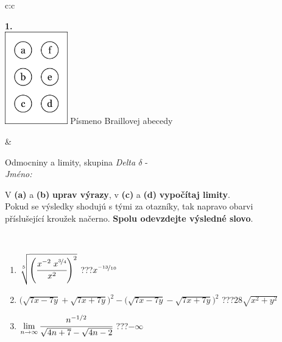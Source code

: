 \documentclass[10pt]{report}
\begin{document}
\begin{tabular}{c:c}
\begin{minipage}[c][104.5mm][t]{0.5\linewidth}
\begin{center}
\begin{minipage}{0.20\linewidth}
\begin{center}
{\Huge\bfseries 1.} \\[2mm]
\includegraphics[height=40mm]{../images/braille.png}
{\small Písmeno Braillovej abecedy}
\end{center}
\end{minipage}
\end{center}
\end{minipage}
&
\begin{minipage}[c][104.5mm][t]{0.5\linewidth}
\begin{center}
\vspace{7mm}
{\huge Odmocniny a limity, skupina \textit{Delta $\delta$} -}\\[5mm]
\textit{Jméno:}\phantom{xxxxxxxxxxxxxxxxxxxxxxxxxxxxxxxxxxxxxxxxxxxxxxxxxxxxxxxxxxxxxxxxx}\\[5mm]
\begin{minipage}{0.95\linewidth}
\begin{center}
V \textbf{(a)} a \textbf{(b)} \textbf{uprav výrazy}, v \textbf{(c)} a \textbf{(d)} \textbf{vypočítaj limity}.\\Pokud se výsledky shodujú s tými za otazníky, tak napravo obarvi\\příslušející kroužek načerno. \textbf{Spolu odevzdejte výsledné slovo}.
\end{center}
\end{minipage}
\\[1mm]
\begin{minipage}{0.79\linewidth}
\begin{center}
\begin{varwidth}{\linewidth}
\begin{enumerate}
\small
\item $\sqrt[5]{\left(\cfrac{x^{-2}\;x^{\nicefrac{3}{4}}}{x^{2}}\right)^{2}}$\quad \dotfill\; ???\;\dotfill \quad $x^{\nicefrac{-13}{10}}$
\item {\footnotesize{\scriptsize$\big(\sqrt{7x-7y}+\sqrt{7x+7y}\big)^2-\big(\sqrt{7x-7y}-\sqrt{7x+7y}\big)^2$}\quad \dotfill\; ???\;\dotfill \quad $28\sqrt{x^2+y^2}$}
\item $\lim\limits_{n\to\infty}\cfrac{n^{-1/2}}{\sqrt{4n+7}-\sqrt{4n-2}}$\quad \dotfill\; ???\;\dotfill \quad $-\infty$

\end{enumerate}
\end{varwidth}
\end{center}
\end{minipage}
\end{center}
\end{minipage}
\end{tabular}
\end{document}
